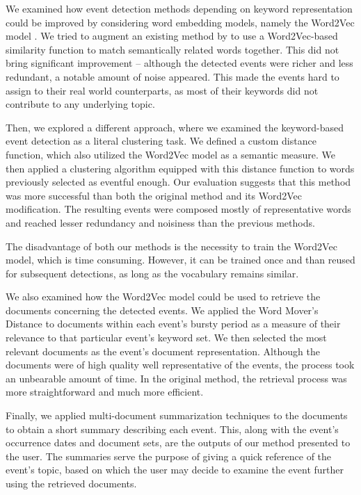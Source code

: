 We examined how event detection methods depending on keyword representation could be improved by considering word embedding models, namely the Word2Vec model \citep{word2vec}. We tried to augment an existing method by \cite{event-detection} to use a Word2Vec-based similarity function to match semantically related words together. This did not bring significant improvement -- although the detected events were richer and less redundant, a notable amount of noise appeared. This made the events hard to assign to their real world counterparts, as most of their keywords did not contribute to any underlying topic.

Then, we explored a different approach, where we examined the keyword-based event detection as a literal clustering task. We defined a custom distance function, which also utilized the Word2Vec model as a semantic measure. We then applied a clustering algorithm equipped with this distance function to words previously selected as eventful enough. Our evaluation suggests that this method was more successful than both the original method and its Word2Vec modification. The resulting events were composed mostly of representative words and reached lesser redundancy and noisiness than the previous methods.

The disadvantage of both our methods is the necessity to train the Word2Vec model, which is time consuming. However, it can be trained once and than reused for subsequent detections, as long as the vocabulary remains similar.

We also examined how the Word2Vec model could be used to retrieve the documents concerning the detected events. We applied the Word Mover's Distance \citep{wmd} to documents within each event's bursty period as a measure of their relevance to that particular event's keyword set. We then selected the most relevant documents as the event's document representation. Although the documents were of high quality well representative of the events, the process took an unbearable amount of time. In the original method, the retrieval process was more straightforward and much more efficient.

Finally, we applied multi-document summarization techniques to the documents to obtain a short summary describing each event. This, along with the event's occurrence dates and document sets, are the outputs of our method presented to the user. The summaries serve the purpose of giving a quick reference of the event's topic, based on which the user may decide to examine the event further using the retrieved documents.

